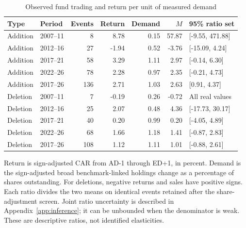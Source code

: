 \begin{table}[!htbp]
\centering
\caption{Observed fund trading and return per unit of measured demand}\label{tab:demand_main}
\small
\setlength{\tabcolsep}{5pt}
\begin{tabular}{llrrrrl}
\toprule
Type & Period & Events & Return & Demand & $M$ & 95\% ratio set \\
\midrule
Addition & 2007--11 & 8 & 8.78 & 0.15 & 57.87 & [-9.55, 471.88] \\
Addition & 2012--16 & 27 & -1.94 & 0.52 & -3.76 & [-15.09, 4.24] \\
Addition & 2017--21 & 58 & 3.29 & 1.11 & 2.97 & [-0.14, 6.30] \\
Addition & 2022--26 & 78 & 2.28 & 0.97 & 2.35 & [-0.21, 4.73] \\
Addition & 2017--26 & 136 & 2.71 & 1.03 & 2.63 & [0.91, 4.37] \\
Deletion & 2007--11 & 7 & -0.19 & 0.26 & -0.72 & All real values \\
Deletion & 2012--16 & 25 & 2.07 & 0.48 & 4.36 & [-17.73, 30.17] \\
Deletion & 2017--21 & 40 & 0.20 & 0.99 & 0.20 & [-4.05, 4.89] \\
Deletion & 2022--26 & 68 & 1.66 & 1.18 & 1.41 & [-0.87, 2.83] \\
Deletion & 2017--26 & 108 & 1.12 & 1.11 & 1.01 & [-0.88, 2.61] \\
\bottomrule
\end{tabular}
\begin{minipage}{\linewidth}\footnotesize\vspace{5pt}
Return is sign-adjusted CAR from AD-1 through ED+1, in percent. Demand is the sign-adjusted broad benchmark-linked holdings change as a percentage of shares outstanding. For deletions, negative returns and sales have positive signs. Each ratio divides the two means on identical events retained after the share-adjustment screen. Joint ratio uncertainty is described in Appendix~\ref{app:inference}; it can be unbounded when the denominator is weak. These are descriptive ratios, not identified elasticities.
\end{minipage}
\end{table}
